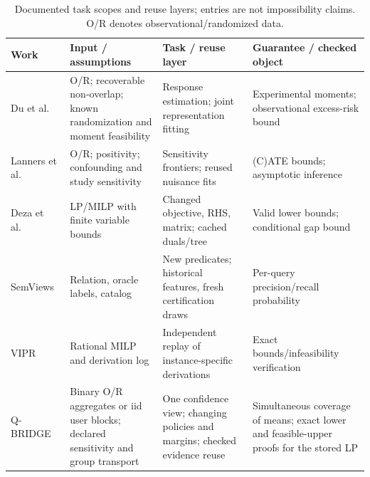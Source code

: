 \begin{table}[t]
\centering
\caption{Documented task scopes and reuse layers; entries are not impossibility claims. O/R denotes observational/randomized data.}
\label{tab:capability-comparison}
\footnotesize
\setlength{\tabcolsep}{3pt}
\renewcommand{\arraystretch}{1.12}
\begin{tabular}{@{}>{\raggedright\arraybackslash}p{}>{\raggedright\arraybackslash}p{}>{\raggedright\arraybackslash}p{}>{\raggedright\arraybackslash}p{}@{}}
\toprule
Work & Input / assumptions & Task / reuse layer & Guarantee / checked object \\
\midrule
Du et al.~\cite{du2026feasible} & O/R; recoverable non-overlap; known randomization and moment feasibility & Response estimation; joint representation fitting & Experimental moments; observational excess-risk bound \\
Lanners et al.~\cite{lanners2025fusion} & O/R; positivity; confounding and study sensitivity & Sensitivity frontiers; reused nuisance fits & (C)ATE bounds; asymptotic inference \\
Deza et al.~\cite{Deza2026MIPSensitivity} & LP/MILP with finite variable bounds & Changed objective, RHS, matrix; cached duals/tree & Valid lower bounds; conditional gap bound \\
SemViews~\cite{Hassanzadeh2026SemanticViews} & Relation, oracle labels, catalog & New predicates; historical features, fresh certification draws & Per-query precision/recall probability \\
VIPR~\cite{Cheung2017VIPR} & Rational MILP and derivation log & Independent replay of instance-specific derivations & Exact bounds/infeasibility verification \\
Q-BRIDGE & Binary O/R aggregates or iid user blocks; declared sensitivity and group transport & One confidence view; changing policies and margins; checked evidence reuse & Simultaneous coverage of means; exact lower and feasible-upper proofs for the stored LP \\
\bottomrule
\end{tabular}
\end{table}
